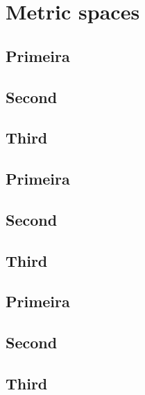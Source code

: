 \documentclass[oneside, 12pt, notitlepage]{book}
\begin{document}
\frontmatter
{}

\contents
\mainmatter

\chapter{Metric spaces}

\section{Primeira}

\section{Second}

\section{Third}

\section{Primeira}

\section{Second}

\section{Third}

\section{Primeira}

\section{Second}

\section{Third}





\backmatter

\printbib
\end{document}
